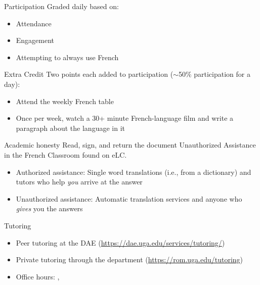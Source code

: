 \begin{frame}{Participation}
  Graded daily based on:
  \begin{itemize}
    \item Attendance
    \item Engagement
    \item Attempting to always use French
  \end{itemize}
\end{frame}

\begin{frame}{Extra Credit}
  Two points each added to participation ($\sim$50\% participation for a day):
  \begin{itemize}
    \item Attend the weekly French table
    \item Once per week, watch a 30+ minute French-language film and write a paragraph about the language in it
  \end{itemize}
\end{frame}

\begin{frame}{Academic honesty}
  Read, sign, and return the document Unauthorized Assistance in the French Classroom found on eLC.
  \begin{itemize}
    \item Authorized assistance: Single word translations (i.e., from a dictionary) and tutors who help \emph{you} arrive at the answer
    \item Unauthorized assistance: Automatic translation services and anyone who \emph{gives} you the answers
  \end{itemize}
\end{frame}

\begin{frame}{Tutoring}
  \begin{itemize}
    \item Peer tutoring at the DAE (\url{https://dae.uga.edu/services/tutoring/})
    \item Private tutoring through the department (\url{https://rom.uga.edu/tutoring})
    \item Office hours: , 
  \end{itemize}
\end{frame}